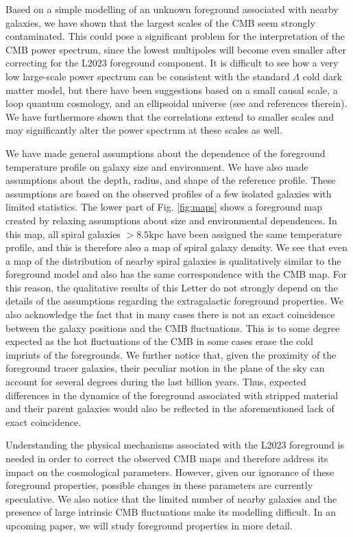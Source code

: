 \documentclass{aa}
\begin{document}
Based on a simple modelling of an unknown foreground associated with nearby galaxies, we have shown that the largest scales of the CMB seem strongly contaminated. This could pose a significant problem for the interpretation of the CMB power spectrum, since the lowest multipoles will become even smaller after correcting for the L2023 foreground component. It is difficult to see how a very low large-scale power spectrum can be consistent with the standard $\Lambda$ cold dark matter model, but there have been suggestions based on a small causal scale, a loop quantum cosmology, and an ellipsoidal universe (see \citealt{lackcorrelations1, lackcorrelations2, lackcorrelations3} and references therein). We have furthermore shown that the correlations extend to smaller scales and may significantly alter the power spectrum at these scales as well.

We have made general assumptions about the dependence of the foreground temperature profile on galaxy size and environment. We have also made assumptions about the depth, radius, and shape of the reference profile. These assumptions are based on the observed profiles of a few isolated galaxies with limited statistics. The lower part of Fig. \ref{fig:maps} shows a foreground map created by relaxing assumptions about size and environmental dependences. In this map, all spiral galaxies $>8.5$\;kpc have been assigned the same temperature profile, and this is therefore also a map of spiral galaxy density. We see that even a map of the distribution of nearby spiral galaxies is qualitatively similar to the foreground model and also has the same correspondence with the CMB map. For this reason, the qualitative results of this Letter do not strongly depend on the details of the assumptions regarding the extragalactic foreground properties. We also acknowledge the fact that in many cases  there is not an exact coincidence between the galaxy positions and the CMB fluctuations. This is to some degree expected as the hot fluctuations of the CMB in some cases erase the cold imprints of the foregrounds. We further notice that, given the proximity of the foreground tracer galaxies, their peculiar motion in the plane of the sky can account for several degrees during the last billion years. Thus, expected differences in the dynamics of the foreground associated with stripped material and their parent galaxies would also be reflected in the aforementioned lack of exact coincidence.

Understanding the physical mechanisms associated with the L2023 foreground is needed in order to correct the observed CMB maps 
and therefore address its impact on the cosmological parameters. However, given our ignorance of these foreground properties, possible changes in these parameters are currently speculative. We also notice that the limited number of nearby galaxies and the presence of large intrinsic
CMB fluctuations make its modelling difficult. In an upcoming paper, we will study foreground properties in more detail.
\end{document}
